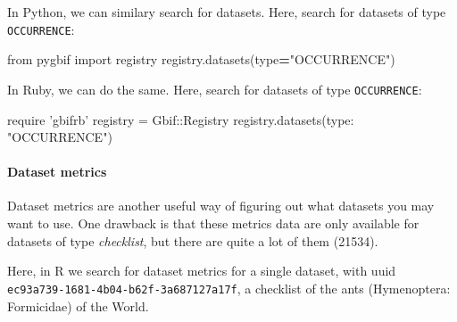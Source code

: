 \documentclass[author-year, review, 11pt]{components/elsarticle} %
\newenvironment{Shaded}{\begin{snugshade}}{\end{snugshade}}
\newcommand{\KeywordTok}[1]{\textcolor[rgb]{0.13,0.29,0.53}{\textbf{#1}}}
\newcommand{\DataTypeTok}[1]{\textcolor[rgb]{0.13,0.29,0.53}{#1}}
\newcommand{\StringTok}[1]{\textcolor[rgb]{0.31,0.60,0.02}{#1}}
\newcommand{\ImportTok}[1]{#1}
\newcommand{\OperatorTok}[1]{\textcolor[rgb]{0.81,0.36,0.00}{\textbf{#1}}}
\newcommand{\BuiltInTok}[1]{#1}
\newcommand{\NormalTok}[1]{#1}
\begin{document}
In Python, we can similary search for datasets. Here, search for
datasets of type \texttt{OCCURRENCE}:

\begin{Shaded}
\begin{Highlighting}[]
\ImportTok{from}\NormalTok{ pygbif }\ImportTok{import}\NormalTok{ registry}
\NormalTok{registry.datasets(}\BuiltInTok{type}\OperatorTok{=}\StringTok{"OCCURRENCE"}\NormalTok{)}
\end{Highlighting}
\end{Shaded}

In Ruby, we can do the same. Here, search for datasets of type
\texttt{OCCURRENCE}:

\begin{Shaded}
\begin{Highlighting}[]
\NormalTok{require }\StringTok{'gbifrb'}
\NormalTok{registry = }\DataTypeTok{Gbif}\NormalTok{::}\DataTypeTok{Registry}
\NormalTok{registry.datasets(}\StringTok{type: "OCCURRENCE"}\NormalTok{)}
\end{Highlighting}
\end{Shaded}

\paragraph{Dataset metrics}\label{dataset-metrics}

Dataset metrics are another useful way of figuring out what datasets you
may want to use. One drawback is that these metrics data are only
available for datasets of type \emph{checklist}, but there are quite a
lot of them (21534).

Here, in R we search for dataset metrics for a single dataset, with uuid
\texttt{ec93a739-1681-4b04-b62f-3a687127a17f}, a checklist of the ants
(Hymenoptera: Formicidae) of the World.

\begin{Shaded}
\end{Shaded}
\end{document}
